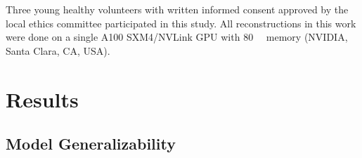 \documentclass[AMA,STIX2COL,Linenumberson]{MRM}
\begin{document}
Three young healthy volunteers with written informed consent
approved by the local ethics committee
participated in this study.
All reconstructions in this work were done on a single A100 SXM4/NVLink GPU
with \SI{80}{\giga\byte} memory (NVIDIA, Santa Clara, CA, USA).

%



\section{Results}\label{SEC:RESULTS}

\subsection{Model Generalizability}
\end{document}
